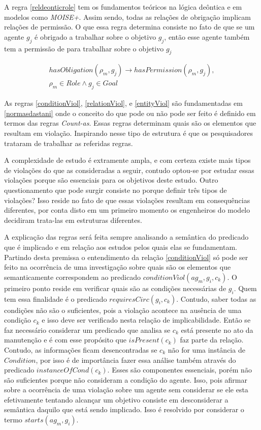 A regra \ref{reldeonticrole} tem os fundamentos teóricos na lógica deôntica e em modelos como \textit{MOISE+}. Assim sendo, todas as relações de obrigação implicam relações de permissão. O que essa regra determina consiste no fato de que se um agente $g_j$ é obrigado a trabalhar sobre o objetivo $g_j$, então esse agente também tem a permissão de para trabalhar sobre o objetivo $g_j$ 

\begin{eqnarray}\label{reldeonticrole}
	hasObligation(\rho_m,g_j) \to hasPermission(\rho_m,g_j), \nonumber \\
    \rho_m \in Role \wedge g_j \in Goal
\end{eqnarray}

As regras \ref{conditionViol}, \ref{relationViol}, e \ref{entityViol} são fundamentadas em \ref{normasdastani} onde o conceito do que pode ou não pode ser feito é definido em termos das regras \textit{Count-as}. Essas regras determinam quais são os elementos que resultam em violação. Inspirando nesse tipo de estrutura é que os pesquisadores trataram de trabalhar as referidas regras. 

A complexidade de estudo é extramente ampla, e com certeza existe mais tipos de violações do que as consideradas a seguir, contudo optou-se por estudar essas violações porque são essenciais para os objetivos deste estudo. Outro questionamento que pode surgir consiste no porque definir três tipos de violações? Isso reside no fato de que essas violações resultam em consequências diferentes, por conta disto em um primeiro momento os engenheiros do modelo decidiram trata-las em estruturas diferentes. 

A explicação das regras será feita sempre analisando a semântica do predicado que é implicado e em relação aos estudos pelos quais elas se fundamentam. Partindo desta premissa o entendimento da relação \ref{conditionViol} só pode ser feito na ocorrência de uma  investigação sobre quais são os elementos que semanticamente correspondem ao predicado $conditionViol(ag_m,g_i,c_k)$. O primeiro ponto reside em verificar quais são as condições necessárias de $g_i$. Quem tem essa finalidade é o predicado $requiresCirc(g_i,c_k)$. Contudo, saber todas as condições não são o suficientes, pois a violação acontece na ausência de uma condição $c_k$ e isso deve ser verificado nesta relação de implicabilidade. Então se faz necessário considerar um predicado que analisa se $c_k$ está presente no ato da manutenção e é com esse propósito que $isPresent(c_k)$ faz parte da relação. Contudo, as informações ficam desencontradas se $c_k$ não for uma instância de $Condition$, por isso é de importância fazer essa análise também através do predicado $instanceOfCond(c_k)$. Esses são componentes essenciais, porém não são suficientes porque não consideram a condição do agente. Isso, pois afirmar sobre a ocorrência de uma violação sobre um agente sem considerar se ele esta efetivamente tentando alcançar um objetivo consiste em desconsiderar a semântica daquilo que está sendo implicado. Isso é resolvido por considerar o termo  $starts(ag_m,g_i)$. 

